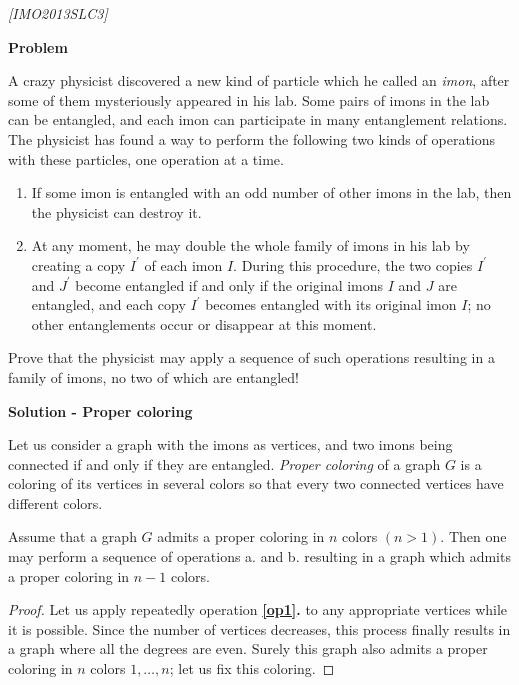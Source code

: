 \begin{problem}

\textit{[IMO2013SLC3]}


\textbf{Problem}


A crazy physicist discovered a new kind of particle which he called an \textit{imon}, after some of them mysteriously appeared in his lab. Some pairs of imons in the lab can be entangled, and each imon can participate in many entanglement relations. The physicist has found a way to perform the following two kinds of operations with these particles, one operation at a time.
\begin{enumerate}
\item \label{op1}  If some imon is entangled with an odd number of other imons in the lab, then the physicist
can destroy it.
\item \label{op2}  At any moment, he may double the whole family of imons in his lab by creating a copy $I^\prime$ of each imon $I$. During this procedure, the two copies $I^\prime$ and $J^\prime$ become entangled if and only if the original imons $I$ and $J$ are entangled, and each copy $I^\prime$ becomes entangled with its original imon $I$; no other entanglements occur or disappear at this moment.
\end{enumerate}
Prove that the physicist may apply a sequence of such operations resulting in a family of imons, no two of which are entangled!


\textbf{Solution - Proper coloring}


Let us consider a graph with the imons as vertices, and two imons being connected if and only if they are entangled. \textit{Proper coloring} of a graph $G$ is a coloring of its vertices in several colors so that every two connected vertices have different colors. 

\begin{lemma}
Assume that a graph $G$ admits a proper coloring in $n$ colors $(n > 1)$. Then one may perform a sequence of operations a. and b. resulting in a graph which admits a proper coloring in $n - 1$ colors.
\end{lemma}

\begin{proof}
Let us apply repeatedly operation \textbf{\ref{op1}.} to any appropriate vertices while it is possible. Since the number of vertices decreases, this process finally results in a graph where all the degrees are even. Surely this graph also admits a proper coloring in $n$ colors $1,\dots, n$; let us fix this coloring.



\end{proof}
\end{problem}
